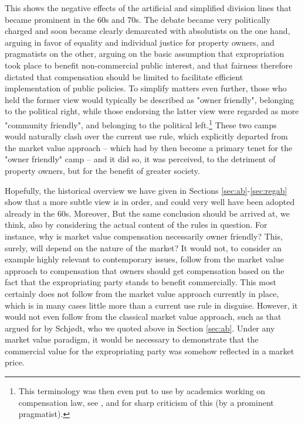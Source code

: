 This shows the negative effects of the artificial and simplified division lines that became prominent in the 60s and 70s. The debate became very politically charged and soon became clearly demarcated with absolutists on the one hand, arguing in favor of equality and individual justice for property owners, and pragmatists on the other, arguing on the basic assumption that expropriation took place to benefit non-commercial public interest, and that fairness therefore dictated that compensation should be limited to facilitate efficient implementation of public policies. To simplify matters even further, those who held the former view would typically be described as "owner friendly", belonging to the political right, while those endorsing the latter view were regarded as more "community friendly", and belonging to the political left.\footnote{This terminology was then even put to use by academics working on compensation law, see \cite{stor}, and \cite{regeksp} for sharp criticism of this (by a prominent pragmatist).} These two camps would naturally clash over the current use rule, which explicitly departed from the market value approach -- which had by then become a primary tenet for the "owner friendly" camp -- and it did so, it was perceived, to the detriment of property owners, but for the benefit of greater society.

Hopefully, the historical overview we have given in Sections \ref{sec:ab}-\ref{sec:regab} show that a more subtle view is in order, and could very well have been adopted already in the 60s. Moreover, But the same conclusion should be arrived at, we think, also by considering the actual content of the rules in question. For instance, why is  market value compensation necessarily owner friendly? This, surely, will depend on the nature of the market? It would not, to consider an example highly relevant to contemporary issues, follow from the market value approach to compensation that owners should get compensation based on the fact that the expropriating party stands to benefit commercially. This most certainly does not follow from the market value approach currently in place, which is in many cases little more than a current use rule in disguise. However, it would not even follow from the classical market value approach, such as that argued for by Schjødt, who we quoted above in Section \ref{sec:ab}. Under any market value paradigm, it would be necessary to demonstrate that the commercial value for the expropriating party was somehow reflected in a market price. 

